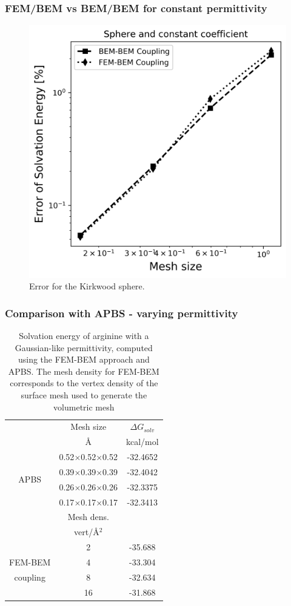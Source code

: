 \documentclass[dvipsnames,10pt]{beamer}
\begin{document}
\begin{frame}
\frametitle{FEM/BEM vs BEM/BEM for constant permittivity}

\begin{figure}
  \centering
  \includegraphics[width=0.6\linewidth]{../figs/Sphere_const_coeff_error.png}
  \caption{Error for the Kirkwood sphere.}
  \label{fig:error_sphere}
\end{figure}
\end{frame}

\begin{frame}
  \frametitle{Comparison with APBS - varying permittivity}
\begin{table}
\centering
\begin{tabular}{c|c|c}
&Mesh size & $\Delta G_{solv}$\\
&\AA       &  kcal/mol \\
\hline
\multirow{4}{*}{APBS}& 0.52$\times$0.52$\times$0.52 & -32.4652\\
& 0.39$\times$0.39$\times$0.39 & -32.4042\\
&0.26$\times$0.26$\times$0.26 & -32.3375\\
&0.17$\times$0.17$\times$0.17 & -32.3413\\
\hline
&Mesh dens. & \\
&vert/\AA$^2$ & \\
\hline
    & 2 & -35.688 \\
FEM-BEM    & 4  & -33.304 \\
coupling    & 8  & -32.634 \\
    & 16 & -31.868 \\
\hline
\end{tabular}
\caption{Solvation energy of arginine with a Gaussian-like permittivity, computed using the FEM-BEM approach and APBS. The mesh density for FEM-BEM corresponds to the vertex density of the surface mesh used to generate the volumetric mesh}
\label{table:arg_variable}
\end{table}
\end{frame}
\end{document}
